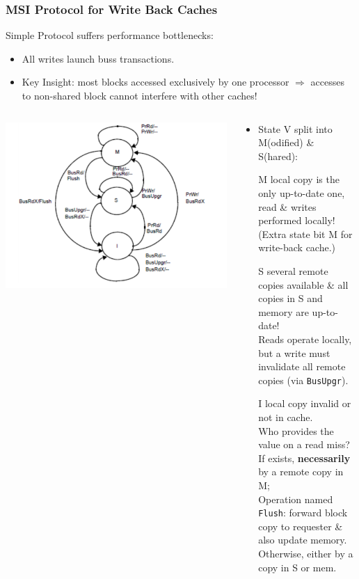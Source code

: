 \documentclass{beamer}
\renewcommand{\emph}[1]{\textcolor{structure}{#1}}
\newcommand{\emp}[1]{\textcolor{DikuRed}{ #1}}
\begin{document}
\begin{frame}[fragile,t]
\frametitle{MSI Protocol for Write Back Caches}

Simple Protocol suffers performance bottlenecks:
\begin{itemize}
    \item \alert{All writes launch buss transactions.}
    \item \emph{Key Insight}: most blocks accessed exclusively
            by one processor $\Rightarrow$ accesses to non-shared 
            block cannot interfere with other caches!
\end{itemize} 


\begin{columns}\hspace{-7ex}
\includegraphics[width=40ex]{FigsInfCoherence/MSI}\pause
{}
\begin{scriptsize}
\begin{itemize}
    \item State V split into M(odified) \& S(hared):\smallskip
    \item[M] local copy is the only up-to-date one,\\
            read \& writes performed locally!\\
            (Extra state bit M for write-back cache.)\smallskip
    \item[S] several remote copies available \& all copies in S and memory are up-to-date!\\
             Reads operate locally, but a write must invalidate 
            all remote copies (via {\tt BusUpgr}).\smallskip
    \item[I] local copy invalid or not in cache.\\
                \emp{Who provides the value on a read miss?}\\
                    \emp{If exists}, {\bf necessarily} by a remote copy in M;\\ 
                    Operation named {\tt Flush}: forward block\\ 
                    copy to requester \& also update memory.\\
                    \emp{Otherwise}, either by a copy in S or mem.
\end{itemize}
\end{scriptsize}
\end{columns}

\end{frame}
\end{document}
